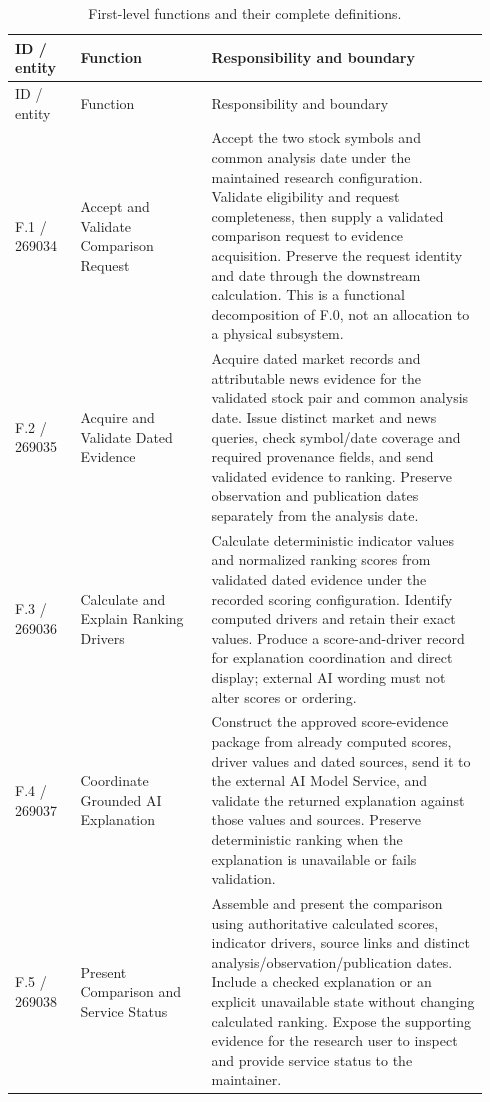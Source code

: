 \documentclass[11pt,letterpaper]{article}
\begin{document}
{\small
\begin{longtable}{@{}>{\raggedright\arraybackslash}p{0.13\linewidth}>{\raggedright\arraybackslash}p{0.26\linewidth}>{\raggedright\arraybackslash}p{0.55\linewidth}@{}}
\caption{First-level functions and their complete definitions.}\\
\toprule ID / entity & Function & Responsibility and boundary\\\midrule\endfirsthead
\toprule ID / entity & Function & Responsibility and boundary\\\midrule\endhead
F.1 / 269034 & Accept and Validate Comparison Request & Accept the two stock symbols and common analysis date under the maintained research configuration. Validate eligibility and request completeness, then supply a validated comparison request to evidence acquisition. Preserve the request identity and date through the downstream calculation. This is a functional decomposition of F.0, not an allocation to a physical subsystem.\\[5pt]
F.2 / 269035 & Acquire and Validate Dated Evidence & Acquire dated market records and attributable news evidence for the validated stock pair and common analysis date. Issue distinct market and news queries, check symbol/date coverage and required provenance fields, and send validated evidence to ranking. Preserve observation and publication dates separately from the analysis date.\\[5pt]
F.3 / 269036 & Calculate and Explain Ranking Drivers & Calculate deterministic indicator values and normalized ranking scores from validated dated evidence under the recorded scoring configuration. Identify computed drivers and retain their exact values. Produce a score-and-driver record for explanation coordination and direct display; external AI wording must not alter scores or ordering.\\[5pt]
F.4 / 269037 & Coordinate Grounded AI Explanation & Construct the approved score-evidence package from already computed scores, driver values and dated sources, send it to the external AI Model Service, and validate the returned explanation against those values and sources. Preserve deterministic ranking when the explanation is unavailable or fails validation.\\[5pt]
F.5 / 269038 & Present Comparison and Service Status & Assemble and present the comparison using authoritative calculated scores, indicator drivers, source links and distinct analysis/observation/publication dates. Include a checked explanation or an explicit unavailable state without changing calculated ranking. Expose the supporting evidence for the research user to inspect and provide service status to the maintainer.\\[5pt]
\bottomrule\end{longtable}
}
\end{document}
